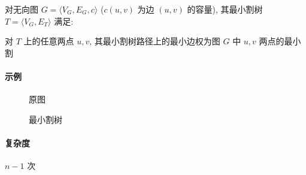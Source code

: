 对无向图 \(G=\langle V_G,E_G,c\rangle\) (\(c(u,v)\) 为边 \((u,v)\) 的容量), 其最小割树 \(T=\langle V_G,E_T\rangle\) 满足:

对 \(T\) 上的任意两点 \(u,v\), 其最小割树路径上的最小边权为图 \(G\) 中 \(u,v\) 两点的最小割

\paragraph{示例} \cite{enwiki:1187705852}

\begin{figure}[h]
    \label{img:gomory-hu-input}
    \centering
    
    \caption{原图}
\end{figure}

\begin{figure}[h]
    \label{img:gomory-hu-output}
    \centering
    
    \caption{最小割树}
\end{figure}

\paragraph{复杂度} \(n-1\) 次 
